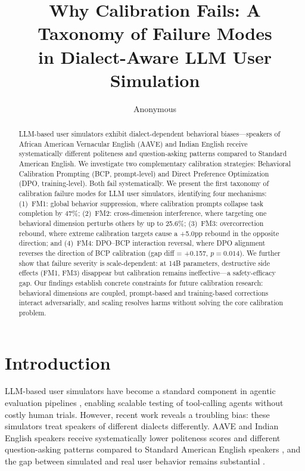 \documentclass[11pt,a4paper]{article}
\title{Why Calibration Fails: A Taxonomy of Failure Modes\\in Dialect-Aware LLM User Simulation}
\author{Anonymous}
\newcommand{\fm}[1]{\textsc{FM#1}}
\newcommand{\bcp}{\textsc{BCP}}
\begin{document}
\maketitle

\begin{abstract}
LLM-based user simulators exhibit dialect-dependent behavioral biases---speakers of African American Vernacular English (AAVE) and Indian English receive systematically different politeness and question-asking patterns compared to Standard American English.
We investigate two complementary calibration strategies: Behavioral Calibration Prompting (\bcp{}, prompt-level) and Direct Preference Optimization (DPO, training-level).
Both fail systematically.
We present the first taxonomy of calibration failure modes for LLM user simulators, identifying four mechanisms:
(1)~\fm{1}: global behavior suppression, where calibration prompts collapse task completion by 47\%;
(2)~\fm{2}: cross-dimension interference, where targeting one behavioral dimension perturbs others by up to 25.6\%;
(3)~\fm{3}: overcorrection rebound, where extreme calibration targets cause a +5.0pp rebound in the opposite direction;
and (4)~\fm{4}: DPO--\bcp{} interaction reversal, where DPO alignment reverses the direction of \bcp{} calibration (gap diff = +0.157, $p = 0.014$).
We further show that failure severity is scale-dependent: at 14B parameters, destructive side effects (\fm{1}, \fm{3}) disappear but calibration remains ineffective---a safety-efficacy gap.
Our findings establish concrete constraints for future calibration research: behavioral dimensions are coupled, prompt-based and training-based corrections interact adversarially, and scaling resolves harms without solving the core calibration problem.
\end{abstract}

\section{Introduction}
\label{sec:intro}

LLM-based user simulators have become a standard component in agentic evaluation pipelines \cite{yao2024taubench}, enabling scalable testing of tool-calling agents without costly human trials.
However, recent work reveals a troubling bias: these simulators treat speakers of different dialects differently.
AAVE and Indian English speakers receive systematically lower politeness scores and different question-asking patterns compared to Standard American English speakers \cite{seshadri2026lost}, and the gap between simulated and real user behavior remains substantial \cite{sim2real2026gap}.
\end{document}
